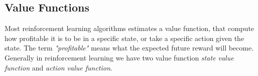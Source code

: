 \documentclass[11pt]{article}
\begin{document}
\subsection{Value Functions}

Most reinforcement learning algorithms estimates a value function,
that compute how profitable it is to be in a specific state,
or take a specific action given the state.
The term \textit{"profitable"} means what the expected future reward will become.
Generally in reinforcement learning we have two value function
\textit{state value function} and \textit{action value function}.





%
%
\end{document}
